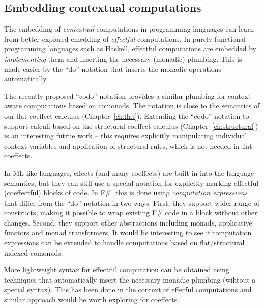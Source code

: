 
\subsection{Embedding contextual computations}
\label{sec:unified-impl-embed}

The embedding of \emph{contextual} computations in programming languages can learn from better 
explored emedding of \emph{effectful} computations. In purely functional programming languages
such as Haskell, effectful computations are embedded by \emph{implementing} them and inserting the
necessary (monadic) plumbing. This is made easier by the ``do'' notation \cite{other-haskell98} 
that inserts the monadic operations automatically.

The recently proposed ``codo'' notation \cite{comonads-codo} provides a similar plumbing for
context-aware computations based on comonads. The notation is close to the semantics of our 
flat coeffect calculus (Chapter~\ref{ch:flat}). Extending the ``codo'' notation to support calculi based 
on the structural coeffect calculus (Chapter~\ref{ch:structural}) is an interesting futrue work -- 
this requires explicitly manipulating individual context variables and application of structural
rules, which is not needed in flat coeffects.

In ML-like languages, effects (and many coeffects) are built-in into the language semantics, 
but they can still use a special notation for explicitly marking effectful (coeffectful) 
blocks of code. In F\#, this is done using \emph{computation expressions}  \cite{app-computation-zoo}
that differ from the ``do'' notation in two ways. First, they support wider range of 
constructs, making it possible to wrap existing F\# code in a block without other changes.
Second, they support other abstractions including monads, applicative functors and monad
transformers. It would be interesting to see if computation expressions can be extended to
handle computations based on flat/structural indexed comonads.

More lightweight syntax for effectful computation can be obtained using
techniques that automatically insert the necessary monadic plumbing (wihtout a
special syntax). This has been done in the context of effecful computations \cite{monads-lightweight-ml}
and similar approach would be worth exploring for coeffects. 


